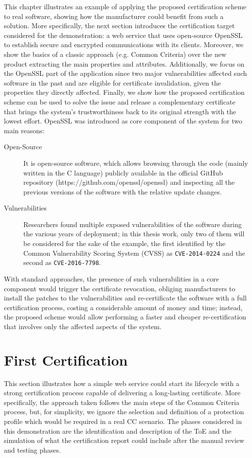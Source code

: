 This chapter illustrates an example of applying the proposed certification scheme to real software, showing how the manufacturer could benefit from such a solution. More specifically, the next section introduces the certification target considered for the demonstration: a web service that uses open-source OpenSSL to establish secure and encrypted communications with its clients. Moreover, we show the basics of a classic approach (e.g. Common Criteria) over the new product extracting the main properties and attributes. Additionally, we focus on the OpenSSL part of the application since two major vulnerabilities affected such software in the past and are eligible for certificate invalidation, given the properties they directly affected. Finally, we show how the proposed certification scheme can be used to solve the issue and release a complementary certificate that brings the system's trustworthiness back to its original strength with the lowest effort. OpenSSL was introduced as core component of the system for two main reasons:
\begin{description}
    \item[Open-Source] It is open-source software, which allows browsing through the code (mainly written in the C language) publicly available in the official GitHub repository (https://github.com/openssl/openssl) and inspecting all the previous versions of the software with the relative update changes.
    \item[Vulnerabilities] Researchers found multiple exposed vulnerabilities of the software during the various years of deployment; in this thesis work, only two of them will be considered for the sake of the example, the first identified by the Common Vulnerability Scoring System (CVSS) as \texttt{CVE-2014-0224} and the second as \texttt{CVE-2016-7798}.
\end{description}

With standard approaches, the presence of such vulnerabilities in a core component would trigger the certificate revocation, obliging manufacturers to install the patches to the vulnerabilities and re-certificate the software with a full certification process, costing a considerable amount of money and time; instead, the proposed scheme would allow performing a faster and cheaper re-certification that involves only the affected aspects of the system.

\section{First Certification}
This section illustrates how a simple web service could start its lifecycle with a strong certification process capable of delivering a long-lasting certificate. More specifically, the approach taken follows the main steps of the Common Criteria process, but, for simplicity, we ignore the selection and definition of a protection profile which would be required in a real CC scenario. The phases considered in this demonstration are the identification and description of the ToE and the simulation of what the certification report could include after the manual review and testing phases.


